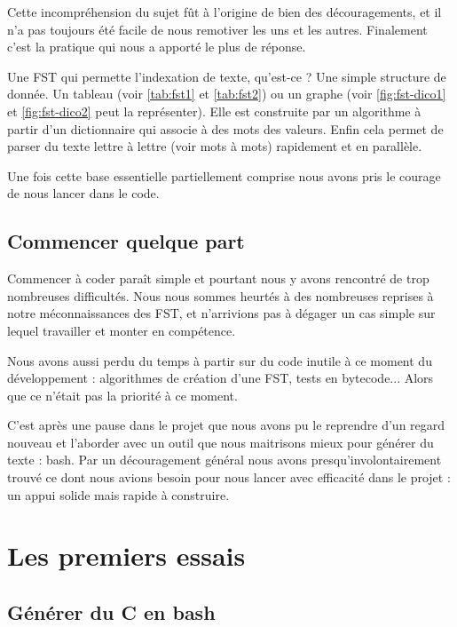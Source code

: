 Cette incompréhension du sujet fût à l'origine de bien des découragements, et il n'a pas toujours
été facile de nous remotiver les uns et les autres. Finalement c'est la pratique qui nous a apporté
le plus de réponse.\newline

Une FST qui permette l'indexation de texte, qu'est-ce ? Une simple structure de donnée. Un tableau
(voir \autoref{tab:fst1} et \autoref{tab:fst2}) ou un graphe (voir \autoref{fig:fst-dico1} et \autoref{fig:fst-dico2} peut la représenter).
Elle est construite par un algorithme à partir d'un dictionnaire qui associe à des mots des valeurs.
Enfin cela permet de parser du texte lettre à lettre (voir mots à mots) rapidement et en parallèle.


Une fois cette base essentielle partiellement comprise nous avons pris le courage de nous lancer
dans le code.

\subsection{Commencer quelque part}

Commencer à coder paraît simple et pourtant nous y avons rencontré de trop nombreuses difficultés.
Nous nous sommes heurtés à des nombreuses reprises à notre méconnaissances des FST, et n'arrivions
pas à dégager un cas simple sur lequel travailler et monter en compétence.

Nous avons aussi perdu du temps à partir sur du code inutile à ce moment du développement :
algorithmes de création d'une FST, tests en bytecode... Alors que ce n'était pas la priorité
à ce moment.\newline


C'est après une pause dans le projet que nous avons pu le reprendre d'un regard nouveau et
l'aborder avec un outil que nous maitrisons mieux pour générer du texte : bash. Par un découragement
général nous avons presqu'involontairement trouvé ce dont nous avions besoin pour nous lancer
avec efficacité dans le projet : un appui solide mais rapide à construire.

\newpage
\section{Les premiers essais}

\subsection{Générer du C en bash}

